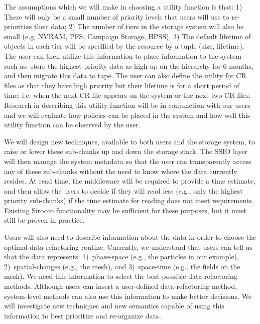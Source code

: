 The assumptions which we will make in choosing a utility function is that:
1) There will only be a small number of priority levels that users will use
to re-prioritize their data; 2) The number of tiers in the storage system will
also be small (e.g. NVRAM, PFS, Campaign Storage, HPSS), 3) The default
lifetime of objects in each tier will be specified by the resource by
a tuple (size, lifetime).  The user can then utilize this information to
place information to the system such as: store the highest priority data
as high up on the hierarchy for 6 months, and then migrate this data to tape.
The user can also define the utility for CR files as that they have high
priority but their lifetime is for a short period of time; i.e. when the
next CR file appears on the system or the next two CR files. Research in
describing this utility function will be in conjunction with our users
and we will evaluate how policies can be placed in the system and how well
this utility function can be observed by the user.


%


We will design new techniques, available to both users and the storage system,
to raise or lower these sub-chunks up and
down the storage stack. The SSIO layer will then manage the system metadata so
that the user can transparently access any of these sub-chunks without
the need to know where the data currently resides.
At read time, the middleware will be required to 
provide a time estimate, and then allow the users to decide if
they will read less (e.g., only the highest priority sub-chunks)
if the time estimate
for reading does not meet requirements. Existing Sirocco functionality may be
sufficient for these purposes, but it must still be proven in practice.
%

Users will also need to describe information about the data in order to choose
the optimal data-refactoring routine. Currently, we understand that
users can tell us that the data represents: 1)~phase-space (e.g., the particles
in our example), 2)~spatial-changes (e.g., the mesh), and 3)~space-time (e.g.,
the fields on the mesh). We need this information to select
the best possible data
refactoring methods. Although users can insert a user-defined data-refactoring
method, system-level methods can also use this information to make better decisions.
We will investigate new techniques and new semantics capable of using
this information to best prioritize and re-organize data.

